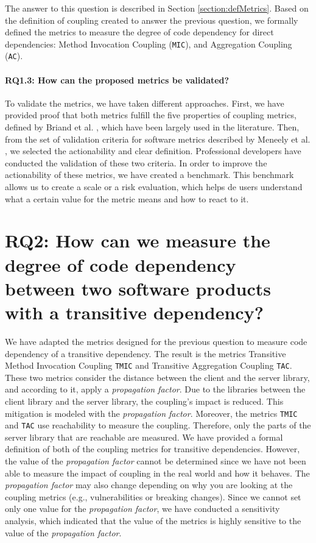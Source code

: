 The answer to this question is described in Section \ref{section:defMetrics}. Based on the definition of coupling created to answer the previous question, we formally defined the metrics to measure the degree of code dependency for direct dependencies: Method Invocation Coupling (\texttt{MIC}), and Aggregation Coupling (\texttt{AC}).

\paragraph{RQ1.3: How can the proposed metrics be validated?}

To validate the metrics, we have taken different approaches. First, we have provided proof that both metrics fulfill the five properties of coupling metrics, defined by Briand et al. \cite{briand1996property}, which have been largely used in the literature. Then, from the set of validation criteria for software metrics described by Meneely et al. \cite{Meneely2012}, we selected the actionability and clear definition. Professional developers have conducted the validation of these two criteria. In order to improve the actionability of these metrics, we have created a benchmark. This benchmark allows us to create a scale or a risk evaluation, which helps de users understand what a certain value for the metric means and how to react to it.

\section{RQ2: How can we measure the degree of code dependency between two software products with a transitive dependency?}

We have adapted the metrics designed for the previous question to measure code dependency of a transitive dependency. The result is the metrics Transitive Method Invocation Coupling \texttt{TMIC} and Transitive Aggregation Coupling \texttt{TAC}. These two metrics consider the distance between the client and the server library, and according to it, apply a \textit{propagation factor}. Due to the libraries between the client library and the server library, the coupling's impact is reduced. This mitigation is modeled with the \textit{propagation factor}. Moreover, the metrics \texttt{TMIC} and \texttt{TAC} use reachability to measure the coupling. Therefore, only the parts of the server library that are reachable are measured. We have provided a formal definition of both of the coupling metrics for transitive dependencies. However, the value of the \textit{propagation factor} cannot be determined since we have not been able to measure the impact of coupling in the real world and how it behaves. The \textit{propagation factor} may also change depending on why you are looking at the coupling metrics (e.g., vulnerabilities or breaking changes). Since we cannot set only one value for the \textit{propagation factor}, we have conducted a sensitivity analysis, which indicated that the value of the metrics is highly sensitive to the value of the \textit{propagation factor}.

